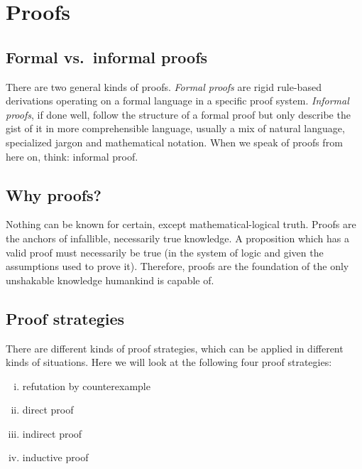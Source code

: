 \documentclass[nobib,nofonts]{tufte-handout}
\begin{document}
{\begin{minipage}{1.0\textwidth}
\begin{exercise}
    \end{exercise}

  \end{minipage}
}

\newpage

\section{Proofs}

\subsection{Formal vs.~informal proofs}

There are two general kinds of proofs.
\emph{Formal proofs} are rigid rule-based derivations operating on a formal language in a specific proof system.
\emph{Informal proofs}, if done well, follow the structure of a formal proof but only describe the gist of it in more comprehensible language, usually a mix of natural language, specialized jargon and mathematical notation.
When we speak of proofs from here on, think: informal proof.

\subsection{Why proofs?}

Nothing can be known for certain, except mathematical-logical truth.
Proofs are the anchors of infallible, necessarily true knowledge.
A proposition which has a valid proof must necessarily be true (in the system of logic and given the assumptions used to prove it).
Therefore, proofs are the foundation of the only unshakable knowledge humankind is capable of.

\subsection{Proof strategies}

There are different kinds of proof strategies, which can be applied in different kinds of situations.
Here we will look at the following four proof strategies:

\begin{enumerate}[(i)]
  \item refutation by counterexample
  \item direct proof
  \item indirect proof
  \item inductive proof
\end{enumerate}
\end{document}
